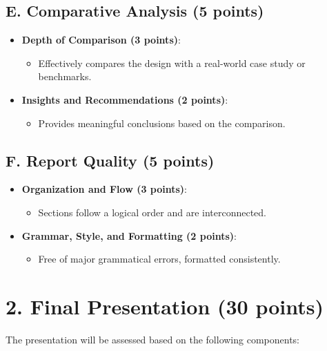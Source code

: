 \documentclass[11pt]{article}
\begin{document}
\subsection*{E. Comparative Analysis (5 points)}
\begin{itemize}
    \item \textbf{Depth of Comparison (3 points)}:
    \begin{itemize}
        \item Effectively compares the design with a real-world case study or benchmarks.
    \end{itemize}
    \item \textbf{Insights and Recommendations (2 points)}:
    \begin{itemize}
        \item Provides meaningful conclusions based on the comparison.
    \end{itemize}
\end{itemize}

\subsection*{F. Report Quality (5 points)}
\begin{itemize}
    \item \textbf{Organization and Flow (3 points)}:
    \begin{itemize}
        \item Sections follow a logical order and are interconnected.
    \end{itemize}
    \item \textbf{Grammar, Style, and Formatting (2 points)}:
    \begin{itemize}
        \item Free of major grammatical errors, formatted consistently.
    \end{itemize}
\end{itemize}

\section*{2. Final Presentation (30 points)}
The presentation will be assessed based on the following components:
\end{document}
